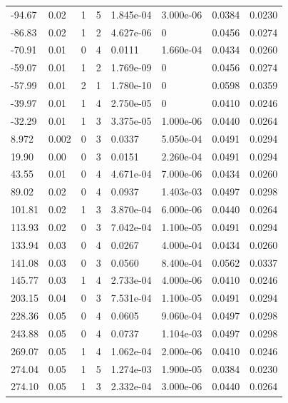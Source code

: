 \documentclass[preview]{standalone}
\begin{document}
{{\begin{tabular}{L{1.2cm}C{1.2cm} C{0.3cm}C{0.5cm} C{1.4cm}C{1.4cm} C{1.4cm}C{1.4cm}}
  -94.67  &  0.02  & 1     &  5 &  1.845e-04  & 3.000e-06  & 0.0384 &  0.0230   \\ 
  -86.83  &  0.02  & 1     &  2 &  4.627e-06  & 0  & 0.0456 &  0.0274   \\ 
  -70.91  &  0.01  & 0     &  4 &  0.0111  & 1.660e-04  & 0.0434 &  0.0260   \\ 
  -59.07  &  0.01  & 1     &  2 &  1.769e-09  & 0  & 0.0456 &  0.0274   \\ 
  -57.99  &  0.01  & 2     &  1 &  1.780e-10  & 0  & 0.0598 &  0.0359   \\ 
  -39.97  &  0.01  & 1     &  4 &  2.750e-05  & 0  & 0.0410 &  0.0246   \\ 
  -32.29  &  0.01  & 1     &  3 &  3.375e-05  & 1.000e-06  & 0.0440 &  0.0264   \\ 
  8.972  &  0.002  & 0     &  3 &  0.0337  & 5.050e-04  & 0.0491 &  0.0294   \\ 
  19.90  &  0.00  & 0     &  3 &  0.0151  & 2.260e-04  & 0.0491 &  0.0294   \\ 
  43.55  &  0.01  & 0     &  4 &  4.671e-04  & 7.000e-06  & 0.0434 &  0.0260   \\ 
  89.02  &  0.02  & 0     &  4 &  0.0937  & 1.403e-03  & 0.0497 &  0.0298   \\ 
  101.81  &  0.02  & 1     &  3 &  3.870e-04  & 6.000e-06  & 0.0440 &  0.0264   \\ 
  113.93  &  0.02  & 0     &  3 &  7.042e-04  & 1.100e-05  & 0.0491 &  0.0294   \\ 
  133.94  &  0.03  & 0     &  4 &  0.0267  & 4.000e-04  & 0.0434 &  0.0260   \\ 
  141.08  &  0.03  & 0     &  3 &  0.0560  & 8.400e-04  & 0.0562 &  0.0337   \\ 
  145.77  &  0.03  & 1     &  4 &  2.733e-04  & 4.000e-06  & 0.0410 &  0.0246   \\ 
  203.15  &  0.04  & 0     &  3 &  7.531e-04  & 1.100e-05  & 0.0491 &  0.0294   \\ 
  228.36  &  0.05  & 0     &  4 &  0.0605  & 9.060e-04  & 0.0497 &  0.0298   \\ 
  243.88  &  0.05  & 0     &  4 &  0.0737  & 1.104e-03  & 0.0497 &  0.0298   \\ 
  269.07  &  0.05  & 1     &  4 &  1.062e-04  & 2.000e-06  & 0.0410 &  0.0246   \\ 
  274.04  &  0.05  & 1     &  5 &  1.274e-03  & 1.900e-05  & 0.0384 &  0.0230   \\ 
  274.10  &  0.05  & 1     &  3 &  2.332e-04  & 3.000e-06  & 0.0440 &  0.0264   \\ 

\end{tabular}}}
\end{document}
